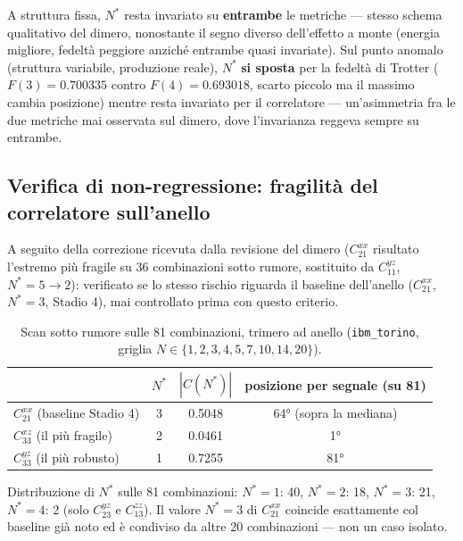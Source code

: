 \documentclass[11pt,a4paper]{article}
\begin{document}
A struttura fissa, $N^*$ resta invariato su \textbf{entrambe} le metriche
--- stesso schema qualitativo del dimero, nonostante il segno diverso
dell'effetto a monte (energia migliore, fedeltà peggiore anziché
entrambe quasi invariate). Sul punto anomalo (struttura variabile,
produzione reale), $N^*$ \textbf{si sposta} per la fedeltà di Trotter
($F(3)=0.700335$ contro $F(4)=0.693018$, scarto piccolo ma il massimo
cambia posizione) mentre resta invariato per il correlatore ---
un'asimmetria fra le due metriche mai osservata sul dimero, dove
l'invarianza reggeva sempre su entrambe.


\subsection{Verifica di non-regressione: fragilità del correlatore sull'anello}

A seguito della correzione ricevuta dalla revisione del dimero
($C_{21}^{xx}$ risultato l'estremo più fragile su 36 combinazioni sotto
rumore, sostituito da $C_{11}^{yz}$, $N^*=5\to2$): verificato se lo stesso
rischio riguarda il baseline dell'anello ($C_{21}^{xx}$, $N^*=3$, Stadio 4),
mai controllato prima con questo criterio.

\begin{table}[htbp]
\centering
\caption{Scan sotto rumore sulle 81 combinazioni, trimero ad anello
(\texttt{ibm\_torino}, griglia $N\in\{1,2,3,4,5,7,10,14,20\}$).}
\label{tab:anello-scan81}
\begin{tabular}{lccc}
\toprule
& $N^*$ & $|C(N^*)|$ & posizione per segnale (su 81) \\
\midrule
$C_{21}^{xx}$ (baseline Stadio 4) & 3 & 0.5048 & 64° (sopra la mediana) \\
$C_{33}^{xz}$ (il più fragile) & 2 & 0.0461 & 1° \\
$C_{33}^{yz}$ (il più robusto) & 1 & 0.7255 & 81° \\
\bottomrule
\end{tabular}
\end{table}

Distribuzione di $N^*$ sulle 81 combinazioni: $N^*{=}1$: 40, $N^*{=}2$: 18,
$N^*{=}3$: 21, $N^*{=}4$: 2 (solo $C_{23}^{yz}$ e $C_{13}^{zz}$). Il valore
$N^*=3$ di $C_{21}^{xx}$ coincide esattamente col baseline già noto ed è
condiviso da altre 20 combinazioni --- non un caso isolato.
\end{document}
